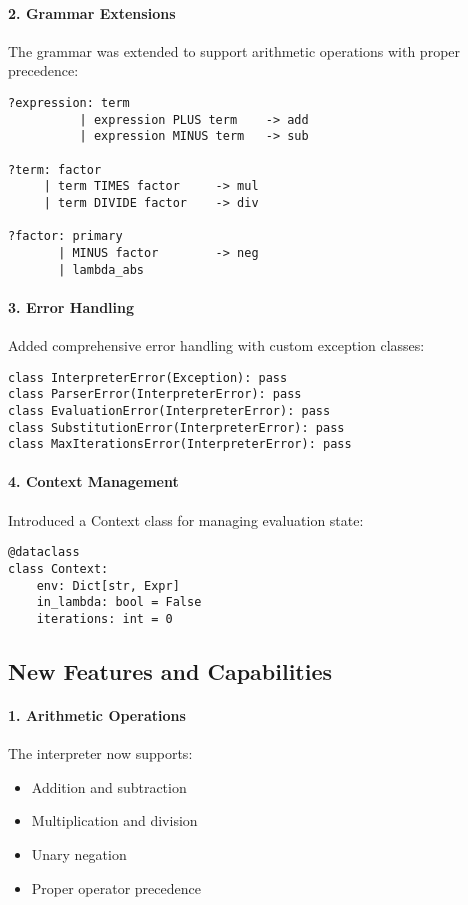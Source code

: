 \paragraph{2. Grammar Extensions}
The grammar was extended to support arithmetic operations with proper precedence:
\begin{verbatim}
?expression: term
          | expression PLUS term    -> add
          | expression MINUS term   -> sub

?term: factor
     | term TIMES factor     -> mul
     | term DIVIDE factor    -> div

?factor: primary
       | MINUS factor        -> neg
       | lambda_abs
\end{verbatim}

\paragraph{3. Error Handling}
Added comprehensive error handling with custom exception classes:
\begin{verbatim}
class InterpreterError(Exception): pass
class ParserError(InterpreterError): pass
class EvaluationError(InterpreterError): pass
class SubstitutionError(InterpreterError): pass
class MaxIterationsError(InterpreterError): pass
\end{verbatim}

\paragraph{4. Context Management}
Introduced a Context class for managing evaluation state:
\begin{verbatim}
@dataclass
class Context:
    env: Dict[str, Expr]
    in_lambda: bool = False
    iterations: int = 0
\end{verbatim}

\subsection{New Features and Capabilities}

\paragraph{1. Arithmetic Operations}
The interpreter now supports:
\begin{itemize}
    \item Addition and subtraction
    \item Multiplication and division
    \item Unary negation
    \item Proper operator precedence
\end{itemize}


